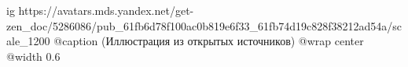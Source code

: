  
 
 
 
 

\ifcmt
  ig https://avatars.mds.yandex.net/get-zen_doc/5286086/pub_61fb6d78f100ac0b819e6f33_61fb74d19c828f38212ad54a/scale_1200
	@caption (Иллюстрация из открытых источников)
  @wrap center
  @width 0.6
\fi
